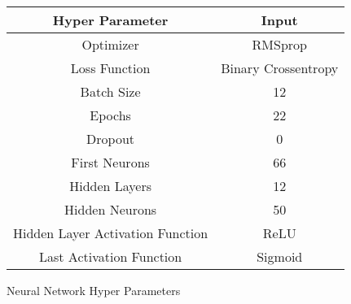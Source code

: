 \begin{tabular}{|c|c|}
	\hline
    Hyper Parameter & Input\\
    \hline
    \hline
    Optimizer & RMSprop  \\
    \hline
    Loss Function & Binary Crossentropy  \\
    \hline
    Batch Size & 12 \\
    \hline
    Epochs & 22\\
    \hline
    Dropout & 0 \\
    \hline
    First Neurons & 66  \\
    \hline
    Hidden Layers & 12  \\
    \hline
    Hidden Neurons & 50  \\
    \hline
    Hidden Layer Activation Function & ReLU\\
    \hline
    Last Activation Function & Sigmoid\\
    \hline
\end{tabular}
\caption{Neural Network Hyper Parameters}
\label{tab:Neural Network Hyper Parameters}